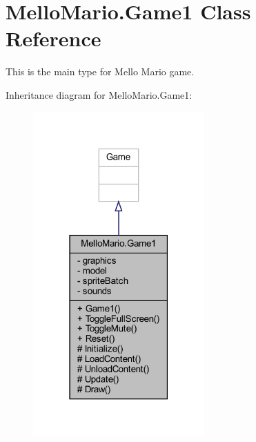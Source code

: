\section{Mello\+Mario.\+Game1 Class Reference}
\label{classMelloMario_1_1Game1}


This is the main type for Mello Mario game.  




Inheritance diagram for Mello\+Mario.\+Game1\+:
\nopagebreak
\begin{figure}[H]
\begin{center}
\leavevmode
\includegraphics[width=186pt]{classMelloMario_1_1Game1__inherit__graph}
\end{center}
\end{figure}



